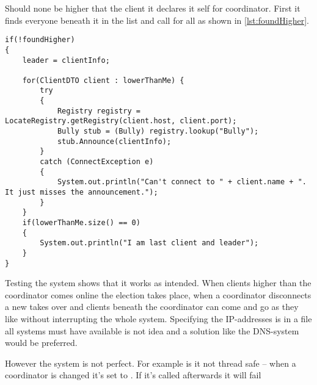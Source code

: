 \documentclass[Main]{subfiles}
\begin{document}
Should none be higher that the client it declares it self for coordinator. 
First it finds everyone beneath it in the list and call  for all as shown in \codeTitle \ref{lst:foundHigher}.


\begin{lstlisting}[caption=Client: StartElection(), style=Code-Java, label=lst:foundHigher]
if(!foundHigher)
{
	leader = clientInfo;

	for(ClientDTO client : lowerThanMe) {
		try 
		{
			Registry registry = LocateRegistry.getRegistry(client.host, client.port);
			Bully stub = (Bully) registry.lookup("Bully");
			stub.Announce(clientInfo); 
		}
		catch (ConnectException e) 
		{
			System.out.println("Can't connect to " + client.name + ". It just misses the announcement.");
		}
	}
	if(lowerThanMe.size() == 0)
	{
		System.out.println("I am last client and leader");
	}
}
\end{lstlisting}


Testing the system shows that it works as intended.
When clients higher than the coordinator comes online the election takes place, when a coordinator disconnects a new takes over and clients beneath the coordinator can come and go as they like without interrupting the whole system.
Specifying the IP-addresses is in a file all systems must have available is not idea and a solution like the DNS-system would be preferred\cite[p. 4]{OurDnsReport}.


However the system is not perfect.
For example is it not thread safe -- when a coordinator is changed it's set to .
If it's called afterwards it will fail
\end{document}

